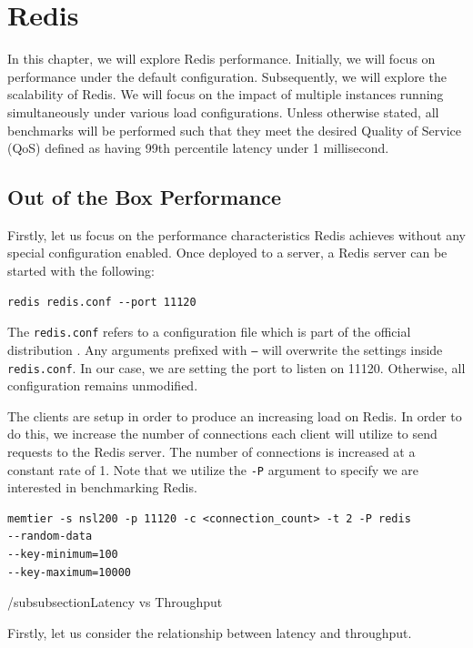 \section{Redis}

In this chapter, we will explore Redis performance. Initially, we will focus on performance under the default configuration. Subsequently, we will explore the scalability of Redis. We will focus on the impact of multiple instances running simultaneously under various load configurations. Unless otherwise stated, all benchmarks will be performed such that they meet the desired Quality of Service (QoS) defined as having 99th percentile latency under 1 millisecond.

\subsection{Out of the Box Performance}
Firstly, let us focus on the performance characteristics Redis achieves without any special configuration enabled. Once deployed to a server, a Redis server can be started with the following:
\begin{lstlisting}
redis redis.conf --port 11120
\end{lstlisting}

The \texttt{redis.conf} refers to a configuration file which is part of the official distribution \cite{RedisConfiguration}. Any arguments prefixed with \texttt{--} will overwrite the settings inside \texttt{redis.conf}. In our case, we are setting the port to listen on 11120. Otherwise, all configuration remains unmodified.

The clients are setup in order to produce an increasing load on Redis. In order to do this, we increase the number of connections each client will utilize to send requests to the Redis server. The number of connections is increased at a constant rate of 1. Note that we utilize the \texttt{-P} argument to specify we are interested in benchmarking Redis.

\begin{lstlisting}
memtier -s nsl200 -p 11120 -c <connection_count> -t 2 -P redis
--random-data
--key-minimum=100
--key-maximum=10000
\end{lstlisting}

/subsubsection{Latency vs Throughput}

Firstly, let us consider the relationship between latency and throughput.

